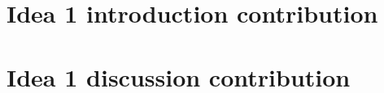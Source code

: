 \documentclass[11pt]{article}
\begin{document}
\section*{Idea 1 introduction contribution}

\section*{Idea 1 discussion contribution}

\clearpage

\end{document}
